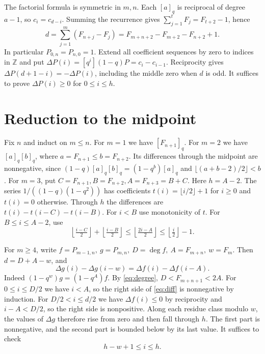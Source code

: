 \documentclass[11pt]{article}
\newcommand{\Z}{\mathbb Z}
\newcommand{\dd}{\Delta}
\begin{document}
The factorial formula is symmetric in \(m,n\). Each \([a]_q\) is
reciprocal of degree \(a-1\), so \(c_i=c_{d-i}\). Summing the
recurrence gives \(\sum_{j=1}^t F_j=F_{t+2}-1\), hence
\begin{equation}\label{eq:degree}
 d=\sum_{j=1}^m(F_{n+j}-F_j)
   =F_{m+n+2}-F_{m+2}-F_{n+2}+1.
\end{equation}
In particular \(P_{0,n}=P_{n,0}=1\). Extend all coefficient sequences
by zero to indices in \(\Z\) and put
\(\dd P(i)=[q^i](1-q)P=c_i-c_{i-1}\). Reciprocity gives
\(\dd P(d+1-i)=-\dd P(i)\), including the middle zero when \(d\) is
odd. It suffices to prove \(\dd P(i)\ge0\) for \(0\le i\le h\).

\section{Reduction to the midpoint}
Fix \(n\) and induct on \(m\le n\). For \(m=1\) we have \([F_{n+1}]_q\).
For \(m=2\) we have \([a]_q[b]_q\), where \(a=F_{n+1}\le b=F_{n+2}\).
Its differences through the midpoint are nonnegative, since
\((1-q)[a]_q[b]_q=(1-q^b)[a]_q\) and
\(\lfloor(a+b-2)/2\rfloor<b\).
For \(m=3\), put \(C=F_{n+1}, B=F_{n+2}, A=F_{n+3}=B+C\).
Here \(h=A-2\). The series \(1/((1-q)(1-q^2))\) has coefficients
\(t(i)=\lfloor i/2\rfloor+1\) for \(i\ge0\) and \(t(i)=0\)
otherwise. Through \(h\) the differences are
\(t(i)-t(i-C)-t(i-B)\). For \(i<B\) use monotonicity of \(t\).
For \(B\le i\le A-2\), use
\[
 \left\lfloor\tfrac{i-C}{2}\right\rfloor+
 \left\lfloor\tfrac{i-B}{2}\right\rfloor
 \le\left\lfloor\tfrac{2i-A}{2}\right\rfloor
 \le\left\lfloor\tfrac i2\right\rfloor-1 .
\]

For \(m\ge4\), write \(f=P_{m-1,n},\ g=P_{m,n},\
D=\deg f,\ A=F_{m+n},\ w=F_m\). Then \(d=D+A-w\), and
\begin{equation}\label{eq:diff}
 \dd g(i)-\dd g(i-w)=\dd f(i)-\dd f(i-A).
\end{equation}
Indeed \((1-q^w)g=(1-q^A)f\). By \eqref{eq:degree},
\(D<F_{m+n+1}<2A\). For \(0\le i\le D/2\) we have \(i<A\),
so the right side of \eqref{eq:diff} is nonnegative by induction.
For \(D/2<i\le d/2\) we have \(\dd f(i)\le0\) by reciprocity and
\(i-A<D/2\), so the right side is nonpositive. Along each residue
class modulo \(w\), the values of \(\dd g\) therefore rise from zero
and then fall through \(h\). The first part is nonnegative, and the
second part is bounded below by its last value. It suffices to check
\begin{equation}\label{eq:window}
 h-w+1\le i\le h .
\end{equation}
\end{document}
